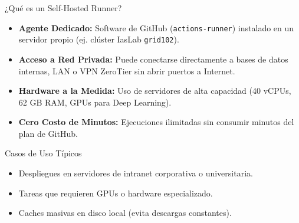 \documentclass[aspectratio=169]{beamer}
\begin{document}

\contentSlideBulletCard
  {¿Qué es un Self-Hosted Runner?}
  {
    \begin{itemize}
      \item \textbf{Agente Dedicado:} Software de GitHub (\texttt{actions-runner}) instalado en un servidor propio (ej. clúster IasLab \texttt{grid102}).
      \item \textbf{Acceso a Red Privada:} Puede conectarse directamente a bases de datos internas, LAN o VPN ZeroTier sin abrir puertos a Internet.
      \item \textbf{Hardware a la Medida:} Uso de servidores de alta capacidad (40 vCPUs, 62 GB RAM, GPUs para Deep Learning).
      \item \textbf{Cero Costo de Minutos:} Ejecuciones ilimitadas sin consumir minutos del plan de GitHub.
    \end{itemize}
  }
  {Casos de Uso Típicos}
  {
    \begin{itemize}
      \item Despliegues en servidores de intranet corporativa o universitaria.
      \item Tareas que requieren GPUs o hardware especializado.
      \item Caches masivas en disco local (evita descargas constantes).
    \end{itemize}
  }
\end{document}
